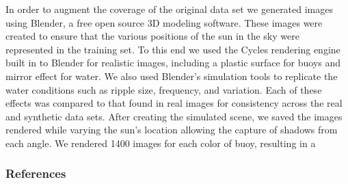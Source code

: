 \documentclass{article} %
\begin{document}
In order to augment the coverage of the original data set we generated images using Blender, a free open source 3D modeling software. These images were created to ensure that the various positions of the sun in the sky were represented in the training set. To this end we used the Cycles rendering engine built in to Blender for realistic images, including a plastic surface for buoys and mirror effect for water. We also used Blender's simulation tools to replicate the water conditions such as ripple size, frequency, and variation. Each of these effects was compared to that found in real images for consistency across the real and synthetic data sets. After creating the simulated scene, we saved the images rendered while varying the sun's location allowing the capture of shadows from each angle. We rendered 1400 images for each color of buoy, resulting in a 

\subsubsection*{References}


\end{document}
